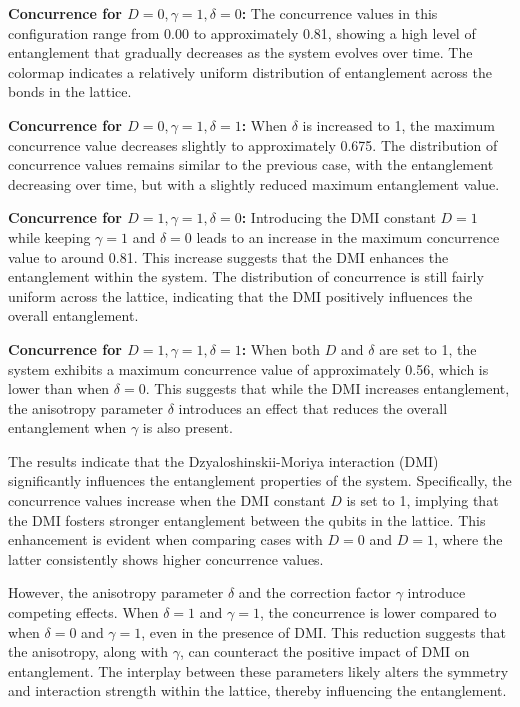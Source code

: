 \textbf{Concurrence for \( D = 0, \gamma = 1, \delta = 0 \):} 
The concurrence values in this configuration range from 0.00 to approximately 0.81, showing a high level of entanglement that gradually decreases as the system evolves over time. The colormap indicates a relatively uniform distribution of entanglement across the bonds in the lattice.


\textbf{Concurrence for \( D = 0, \gamma = 1, \delta = 1 \):} 
When \(\delta\) is increased to 1, the maximum concurrence value decreases slightly to approximately 0.675. The distribution of concurrence values remains similar to the previous case, with the entanglement decreasing over time, but with a slightly reduced maximum entanglement value.


\textbf{Concurrence for \( D = 1, \gamma = 1, \delta = 0 \):} 
Introducing the DMI constant \(D = 1\) while keeping \(\gamma = 1\) and \(\delta = 0\) leads to an increase in the maximum concurrence value to around 0.81. This increase suggests that the DMI enhances the entanglement within the system. The distribution of concurrence is still fairly uniform across the lattice, indicating that the DMI positively influences the overall entanglement.


\textbf{Concurrence for \( D = 1, \gamma = 1, \delta = 1 \):} 
When both \(D\) and \(\delta\) are set to 1, the system exhibits a maximum concurrence value of approximately 0.56, 
which is lower than when \(\delta = 0\). This suggests that while the DMI increases entanglement, the anisotropy 
parameter \(\delta\) introduces an effect that reduces the overall entanglement when \(\gamma\) is also present.





The results indicate that the Dzyaloshinskii-Moriya interaction (DMI) significantly influences the entanglement properties of the 
system. Specifically, the concurrence values increase when the DMI constant \(D\) is set to 1, implying that the DMI fosters 
stronger entanglement between the qubits in the lattice. This enhancement is evident when comparing cases with \(D = 0\) and 
\(D = 1\), where the latter consistently shows higher concurrence values.

However, the anisotropy parameter \(\delta\) and the correction factor \(\gamma\) introduce competing effects. When 
\(\delta = 1\) and \(\gamma = 1\), the concurrence is lower compared to when \(\delta = 0\) and \(\gamma = 1\), even 
in the presence of DMI. This reduction suggests that the anisotropy, along with \(\gamma\), can counteract the positive 
impact of DMI on entanglement. The interplay between these parameters likely alters the symmetry and interaction strength
within the lattice, thereby influencing the entanglement.

